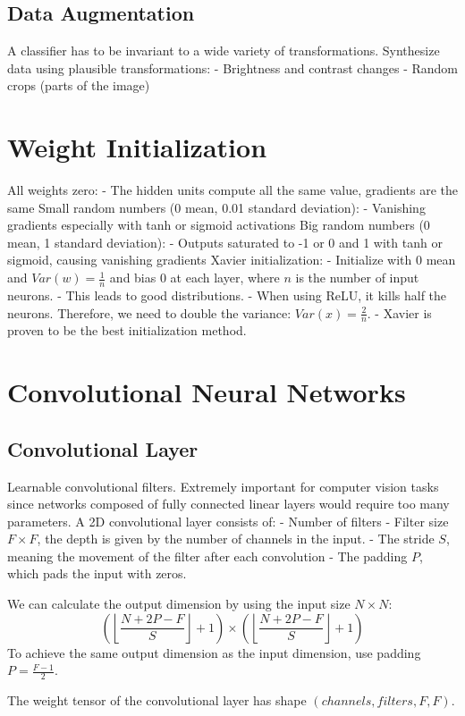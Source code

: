 \documentclass{scrartcl}
\begin{document}
\subsection*{Data Augmentation}
A classifier has to be invariant to a wide variety of transformations.
Synthesize data using plausible transformations:
- Brightness and contrast changes
- Random crops (parts of the image)


\section*{Weight Initialization}
All weights zero:
- The hidden units compute all the same value, gradients are the same
Small random numbers (0 mean, 0.01 standard deviation):
- Vanishing gradients especially with tanh or sigmoid activations
Big random numbers (0 mean, 1 standard deviation):
- Outputs saturated to -1 or 0 and 1 with tanh or sigmoid, causing vanishing gradients
Xavier initialization:
- Initialize with 0 mean and $Var(w) = \frac{1}{n}$ and bias 0 at each layer, where $n$ is the number of input neurons.
- This leads to good distributions.
- When using ReLU, it kills half the neurons. Therefore, we need to double the variance: $Var(x) = \frac{2}{n}$.
- Xavier is proven to be the best initialization method.


\section*{Convolutional Neural Networks}
\subsection*{Convolutional Layer}
Learnable convolutional filters. Extremely important for computer vision tasks since networks composed of fully connected linear layers would require too many parameters. 
A 2D convolutional layer consists of:
- Number of filters
- Filter size $F \times F$, the depth is given by the number of channels in the input.
- The stride $S$, meaning the movement of the filter after each convolution
- The padding $P$, which pads the input with zeros.

We can calculate the output dimension by using the input size $N \times N$:
$$\left (\left \lfloor{\frac{N + 2P - F}{S}}\right \rfloor + 1 \right) \times \left (\left \lfloor{\frac{N + 2P - F}{S}}\right \rfloor + 1 \right)$$
To achieve the same output dimension as the input dimension, use padding $P = \frac{F - 1}{2}$.

The weight tensor of the convolutional layer has shape $(channels, filters, F, F)$.
\end{document}
